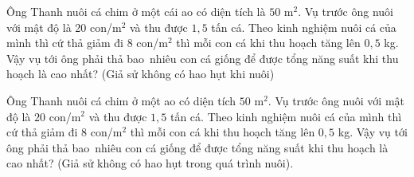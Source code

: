 \begin{bt}%
	Ông Thanh nuôi cá chim ở một cái ao có diện tích là $ 50$ m$^2$. Vụ trước ông nuôi với mật độ là 20 con/m$^2$ và thu được $1{,}5$ tấn cá. Theo kinh nghiệm nuôi cá của mình thì cứ thả giảm đi 8 con/m$^2$ thì mỗi con cá khi thu hoạch tăng lên $0{,}5$ kg. Vậy vụ tới  ông phải thả bao~nhiêu con cá giống để được tổng năng suất khi thu hoạch là cao nhất? (Giả sử không có hao hụt khi nuôi)
\end{bt}

\begin{bt}%
	Ông Thanh nuôi cá chim ở một ao có diện tích $50$ m$^2$. Vụ trước ông nuôi với mật độ là $20$ con/m$^2$ và thu được $1{,}5$ tấn cá. Theo kinh nghiệm nuôi cá của mình thì cứ  thả giảm đi $8$ con/m$^2$ thì mỗi con cá khi thu hoạch tăng lên $0{,}5$ kg. Vậy vụ tới ông phải thả bao~nhiêu con cá giống để được tổng năng suất khi thu hoạch là cao nhất? (Giả sử không có hao hụt trong quá trình nuôi). \\
\end{bt}

